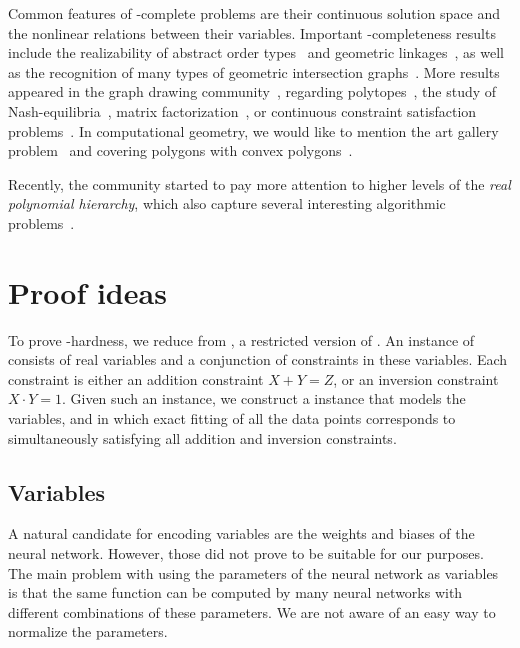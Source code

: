 Common features of \ER-complete problems are their continuous solution space and the nonlinear relations between their variables.
Important \ER-completeness results include the realizability of abstract order types~\cite{Mnev1988_UniversalityTheorem, Shor1991_Stretchability} and geometric linkages~\cite{Schaefer2013_Realizability}, as well as the recognition of many types of geometric intersection graphs~\cite{Cardinal2018_Intersection,Kang2012_Sphere,Kratochvil1994_IntersectionGraphs, Matousek2014_IntersectionGraphsER,McDiarmid2013_DiskSegmentGraphs}.
More results appeared in the graph drawing community~\cite{Dobbins2023_AreaUniversality, Jungeblut2024_Lombardi, Lubiw2022_DrawingInPolygonialRegion, Schaefer2021_FixedK, Schaefer2023_RAC}, regarding polytopes~\cite{Richter1995_Polytopes}, the study of Nash-equilibria~\cite{Berthelsen2022_MultiPlayerNash, Bilo2021_Nash, Garg2018_MultiPlayer, Schaefer2017_FixedPointsNash}, matrix factorization~\cite{Chistikov2016_Matrix, Schaefer2018_TensorRank, Shitov2017_PSMatrixFactorization}, or continuous constraint satisfaction problems~\cite{Miltzow2022_ContinuousCSP}.
In computational geometry, we would like to mention the art gallery problem~\cite{Abrahamsen2022_ArtGallery, Stade2023_ArtGallery} and covering polygons with convex polygons~\cite{Abrahamsen2022_Covering}.

Recently, the community started to pay more attention to higher levels of the \emph{real polynomial hierarchy}, which also capture several interesting algorithmic problems~\cite{Blanc2021_ESS, Burgisser2009_ExoticQuantifiers, DCosta2021_EscapeProblem, Dobbins2023_AreaUniversality, Jungeblut2024_Hausdorff, Schaefer2023_RealHierarchy}.

\section{Proof ideas}
\label{sec:key_ideas}

To prove \ER-hardness, we reduce from \ETRINV, a restricted version of \ETR.
An instance of \ETRINV consists of real variables and a conjunction of constraints in these variables.
Each constraint is either an addition constraint $X + Y = Z$, or an inversion constraint $X \cdot Y = 1$.
Given such an instance, we construct a \trainNN instance that models the variables, and in which exact fitting of all the data points corresponds to simultaneously satisfying all addition and inversion constraints.

\subsection{Variables}   %
A natural candidate for encoding variables are the weights and biases of the neural network.
However, those did not prove to be suitable for our purposes.
The main problem with using the parameters of the neural network as variables is that the same function can be computed by many neural networks with different combinations of these parameters.
We are not aware of an easy way to normalize the parameters.

